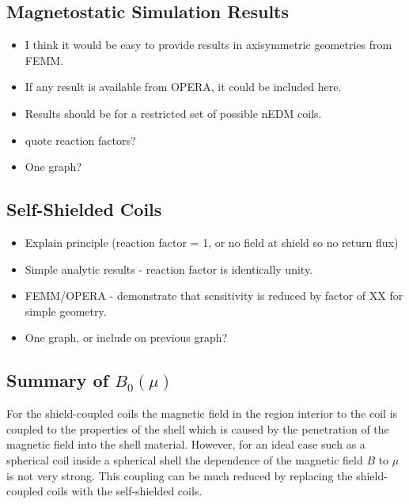 \documentclass[review]{elsarticle}
\begin{document}
\subsection{Magnetostatic Simulation Results}

\begin{itemize}
\item I think it would be easy to provide results in axisymmetric
  geometries from FEMM.
\item If any result is available from OPERA, it could be included here.
\item Results should be for a restricted set of possible nEDM coils.
\item quote reaction factors?
\item One graph?  %
\end{itemize}

\subsection{Self-Shielded Coils}

\begin{itemize}
\item Explain principle (reaction factor = 1, or no field at shield so
  no return flux)
\item Simple analytic results - reaction factor is identically unity.
\item FEMM/OPERA - demonstrate that sensitivity is reduced by factor
  of XX for simple geometry.
\item One graph, or include on previous graph?
\end{itemize}

\subsection{Summary of $B_0(\mu)$}
For the shield-coupled coils the magnetic field in the region interior to the coil is coupled to the properties of the shell which is caused by the penetration of the magnetic field into the shell material. However, for an ideal case such as a spherical coil inside a spherical shell the dependence of the magnetic field $B$ to $\mu$ is not very strong. This coupling can be much reduced by replacing the shield-coupled coils with the self-shielded coils.
\end{document}
